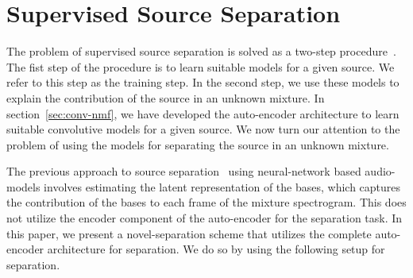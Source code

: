 \documentclass{article}
\begin{document}



\section{Supervised Source Separation}
\label{sec:ss}
The problem of supervised source separation is solved as a two-step procedure~\cite{smaragdis2007supervised}. The fist step of the procedure is to learn suitable models for a given source. We refer to this step as the training step. In the second step, we use these models to explain the contribution of the source in an unknown mixture. In section~\ref{sec:conv-nmf}, we have developed the auto-encoder architecture to learn suitable convolutive models for a given source. We now turn our attention to the problem of using the models for separating the source in an unknown mixture.

The previous approach to source separation~\cite{smaragdis2017aneural} using neural-network based audio-models involves estimating the latent representation of the bases, which captures the contribution of the bases to each frame of the mixture spectrogram. This does not utilize the encoder component of the auto-encoder for the separation task. In this paper, we present a novel-separation scheme that utilizes the complete auto-encoder architecture for separation. We do so by using the following setup for separation. 
\end{document}
